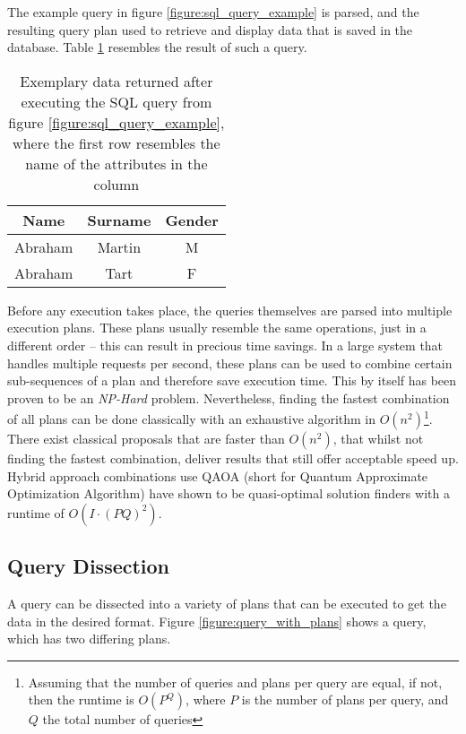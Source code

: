 The example query in figure \ref{figure:sql_query_example} is parsed, and the resulting query plan used to retrieve and display data that is saved in the database. Table \ref{table:sql_query_result_example} resembles the result of such a query.

\begin{table}[!h]
    \centering
    \begin{tabular}{|c|c|c|}
        \hline
        Name    & Surname & Gender \\ \hline
        Abraham & Martin  & M      \\ \hline
        Abraham & Tart    & F      \\ \hline
    \end{tabular}
    \caption{Exemplary data returned after executing the SQL query from figure \ref{figure:sql_query_example}, where the first row resembles the name of the attributes in the column}
    \label{table:sql_query_result_example}
\end{table}

Before any execution takes place, the queries themselves are parsed into multiple execution plans\cite{microsoft_execution_nodate}. These plans usually resemble the same operations, just in a different order – this can result in precious time savings. In a large system that handles multiple requests per second, these plans can be used to combine certain sub-sequences of a plan and therefore save execution time\cite{roy_multi-query_2009}. This by itself has been proven to be an \emph{NP-Hard} problem\cite{}. Nevertheless, finding the fastest combination of all plans can be done classically with an exhaustive algorithm in $O(n^2)$\footnote{Assuming that the number of queries and plans per query are equal, if not, then the runtime is $O(P^Q)$, where $P$ is the number of plans per query, and $Q$ the total number of queries}. There exist classical proposals that are faster than $O(n^2)$\cite{}, that whilst not finding the fastest combination, deliver results that still offer acceptable speed up. Hybrid approach combinations use QAOA (short for Quantum Approximate Optimization Algorithm)\cite{} have shown to be quasi-optimal solution finders with a runtime of $O(I \cdot (PQ)^2)$.\par

\subsection{Query Dissection}
A query can be dissected into a variety of plans that can be executed to get the data in the desired format. Figure \ref{figure:query_with_plans} shows a query, which has two differing plans.

